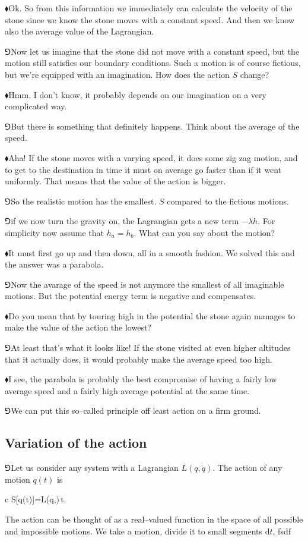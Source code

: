 \documentclass[11pt,oneside%
]{memoir}
\newenvironment{eqna}{\begin{IEEEeqnarray*}{c}}{\end{IEEEeqnarray*}\ignorespacesafterend}
\newcommand{\dd}{\mathrm{d}}
\newcommand{\hea}{\(\blacklozenge\)\;}
\newcommand{\heb}{\(\Game\)\;}
\begin{document}
\hea Ok. So from this information we immediately can calculate the velocity of the stone since we know the stone moves with a constant speed. And then we know also the average value of the Lagrangian.

\heb Now let us imagine that the stone did not move with a constant speed, but the motion still satisfies our boundary conditions. Such a motion is of course fictious, but we're equipped with an imagination. How does the action \(S\) change?

\hea Hmm. I don't know, it probably depends on our imagination on a very complicated way.

\heb But there is something that definitely happens. Think about the average of the speed.

\hea Aha! If the stone moves with a varying speed, it does some zig zag motion, and to get to the destination in time it must on average go faster than if it went uniformly. That means that the value of the action is bigger.

\heb So the realistic motion has the smallest. \(S\) compared to the fictious motions.

\heb if we now turn the gravity on, the Lagrangian gets a new term \(-\lambda h\). For simplicity now assume that \(h_a=h_b\). What can you say about the motion?

\hea It must first go up and then down, all in a smooth fashion. We solved this and the answer was a parabola.

\heb Now the avarage of the speed is not anymore the smallest of all imaginable motions. But the potential energy term is negative and compensates.

\hea Do you mean that by touring high in the potential the stone again manages to make the value of the action the lowest?

\heb At least that's what it looks like! If the stone visited at even higher altitudes that it actually does, it would probably make the average speed too high.

\hea I see, the parabola is probably the best compromise of having a fairly low average speed and a fairly high average potential at the same time.

\heb We can put this so--called principle off least action on a firm ground.
\subsection{Variation of the action}
\heb Let us consider any system with a Lagrangian \(L(q,\dot{q})\). The action of any motion \(q(t)\) is
\begin{eqna}
    S[q(t)]=\int L(q,)\,\dd t.
\end{eqna}
The action can be thought of as a real--valued function in the space of all possible and impossible motions. We take a motion, divide it to small segments \(\dd t\), fsdf
\end{document}
